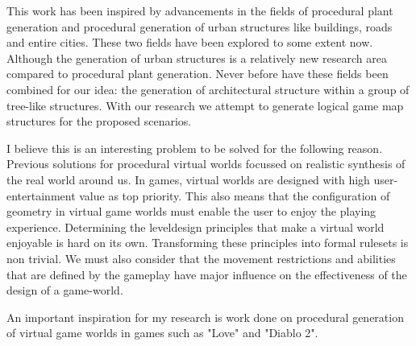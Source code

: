 This work has been inspired by advancements in the fields of procedural plant generation and procedural generation of urban structures like buildings, roads and entire cities. These two fields have been explored to some extent now. Although the generation of urban structures is a relatively new research area compared to procedural plant generation. Never before have these fields been combined for our idea: the generation of architectural structure within a group of tree-like structures. With our research we attempt to generate logical game map structures for the proposed scenarios.

I believe this is an interesting problem to be solved for the following reason. Previous solutions for procedural virtual worlds focussed on realistic synthesis of the real world around us. In games, virtual worlds are designed with high user-entertainment value as top priority. This also means that the configuration of geometry in virtual game worlds must enable the user to enjoy the playing experience. Determining the leveldesign principles that make a virtual world enjoyable is hard on its own. Transforming these principles into formal rulesets is non trivial. We must also consider that the movement restrictions and abilities that are defined by the gameplay have major influence on the effectiveness of the design of a game-world. 


An important inspiration for my research is work done on procedural generation of virtual game worlds in games such as "Love" and "Diablo 2". 


